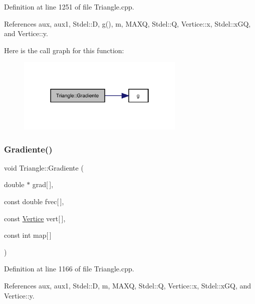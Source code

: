 Definition at line 1251 of file Triangle.\+cpp.



References aux, aux1, Stdel\+::D, g(), m, M\+A\+XQ, Stdel\+::Q, Vertice\+::x, Stdel\+::x\+GQ, and Vertice\+::y.

Here is the call graph for this function\+:
\nopagebreak
\begin{figure}[H]
\begin{center}
\leavevmode
\includegraphics[width=226pt]{classTriangle_af55fef533efd5d2a7b8f3954d5ad7dda_cgraph}
\end{center}
\end{figure}
\mbox{\label{classTriangle_a2c5934a28512e5adb9dee4d71fc4bf26}} 
\subsubsection{\texorpdfstring{Gradiente()}{Gradiente()}\hspace{0.1cm}{\footnotesize\ttfamily [3/6]}}
{\footnotesize\ttfamily void Triangle\+::\+Gradiente (\begin{DoxyParamCaption}\item[{double $\ast$}]{grad\mbox{[}$\,$\mbox{]},  }\item[{const double}]{fvec\mbox{[}$\,$\mbox{]},  }\item[{const \hyperlink{structVertice}{Vertice}}]{vert\mbox{[}$\,$\mbox{]},  }\item[{const int}]{map\mbox{[}$\,$\mbox{]} }\end{DoxyParamCaption})\hspace{0.3cm}{\ttfamily [virtual]}}



Definition at line 1166 of file Triangle.\+cpp.



References aux, aux1, Stdel\+::D, m, M\+A\+XQ, Stdel\+::Q, Vertice\+::x, Stdel\+::x\+GQ, and Vertice\+::y.

\mbox{\label{classStdel_af3e65d1ad0d59ded925a3f5a9d0fb100}} 
